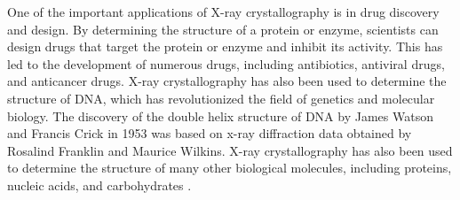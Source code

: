 \documentclass[10pt]{article}
\begin{document}
One of the important applications of X-ray crystallography is in drug discovery and design. By determining the structure of a protein or enzyme, scientists can design drugs that target the protein or enzyme and inhibit its activity. This has led to the development of numerous drugs, including antibiotics, antiviral drugs, and anticancer drugs. X-ray crystallography has also been used to determine the structure of DNA, which has revolutionized the field of genetics and molecular biology. The discovery of the double helix structure of DNA by James Watson and Francis Crick in 1953 was based on x-ray diffraction data obtained by Rosalind Franklin and Maurice Wilkins. X-ray crystallography has also been used to determine the structure of many other biological molecules, including proteins, nucleic acids, and carbohydrates \cite{Bijak_2023}.

\printbibliography
\end{document}
